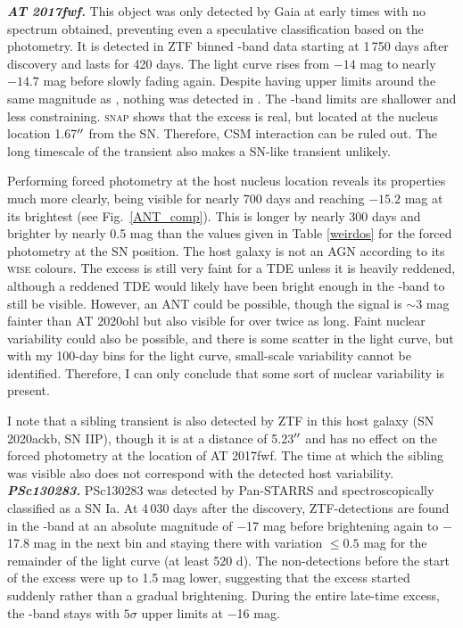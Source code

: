 \documentclass[a4paper,oneside,12pt, class=Latex/Classes/PhDthesisPSnPDF, crop=false]{standalone}
\begin{document}
\textit{\textbf{AT 2017fwf.}}
This object was only detected by Gaia at early times with no spectrum obtained, preventing even a speculative classification based on the photometry. It is detected in ZTF binned \ztfr-band data starting at 1\,750 days after discovery and lasts for 420 days. The light curve rises from $-14$ mag to nearly $-14.7$ mag before slowly fading again. Despite having upper limits around the same magnitude as \ztfr, nothing was detected in \ztfg. The \ztfi-band limits are shallower and less constraining. \textsc{snap} shows that the excess is real, but located at the nucleus location 1.67$^{\prime\prime}$ from the SN. Therefore, CSM interaction can be ruled out. The long timescale of the transient also makes a SN-like transient unlikely.

Performing forced photometry at the host nucleus location reveals its properties much more clearly, being visible for nearly 700 days and reaching $-15.2$ mag at its brightest (see Fig.~\ref{ANT_comp}). This is longer by nearly 300 days and brighter by nearly 0.5 mag than the values given in Table \ref{weirdos} for the forced photometry at the SN position. The host galaxy is not an AGN according to its \textsc{wise} colours. The excess is still very faint for a TDE unless it is heavily reddened, although a reddened TDE would likely have been bright enough in the \ztfi-band to still be visible. However, an ANT could be possible, though the signal is $\sim3$ mag fainter than AT 2020ohl but also visible for over twice as long. Faint nuclear variability could also be possible, and there is some scatter in the light curve, but with my 100-day bins for the light curve, small-scale variability cannot be identified. Therefore, I can only conclude that some sort of nuclear variability is present.

I note that a sibling transient is also detected by ZTF in this host galaxy (SN 2020ackb, SN IIP), though it is at a distance of 5.23$^{\prime\prime}$ and has no effect on the forced photometry at the location of AT 2017fwf. The time at which the sibling was visible also does not correspond with the detected host variability.\\


\textit{\textbf{PSc130283.}}
PSc130283 was detected by Pan-STARRS and spectroscopically classified as a SN Ia. At 4\,030 days after the discovery, ZTF-detections are found in the \ztfr-band at an absolute magnitude of $-$17 mag before brightening again to $-$17.8 mag in the next bin and staying there with variation $\leq 0.5$ mag for the remainder of the light curve (at least 520 d). The non-detections before the start of the excess were up to 1.5 mag lower, suggesting that the excess started suddenly rather than a gradual brightening. During the entire late-time excess, the \ztfg-band stays with $5\sigma$ upper limits at $-$16 mag.
\end{document}
